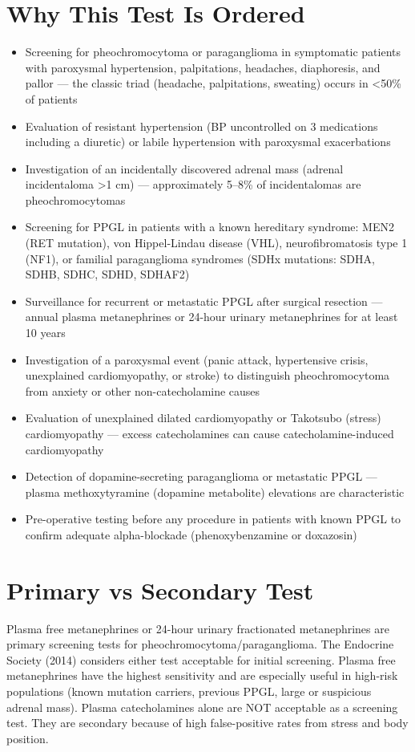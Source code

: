 \section*{Why This Test Is Ordered}
\begin{itemize}
  \item Screening for pheochromocytoma or paraganglioma in symptomatic patients with paroxysmal hypertension, palpitations, headaches, diaphoresis, and pallor --- the classic triad (headache, palpitations, sweating) occurs in <50\% of patients
  \item Evaluation of resistant hypertension (BP uncontrolled on 3 medications including a diuretic) or labile hypertension with paroxysmal exacerbations
  \item Investigation of an incidentally discovered adrenal mass (adrenal incidentaloma >1 cm) --- approximately 5--8\% of incidentalomas are pheochromocytomas
  \item Screening for PPGL in patients with a known hereditary syndrome: MEN2 (RET mutation), von Hippel-Lindau disease (VHL), neurofibromatosis type 1 (NF1), or familial paraganglioma syndromes (SDHx mutations: SDHA, SDHB, SDHC, SDHD, SDHAF2)
  \item Surveillance for recurrent or metastatic PPGL after surgical resection --- annual plasma metanephrines or 24-hour urinary metanephrines for at least 10 years
  \item Investigation of a paroxysmal event (panic attack, hypertensive crisis, unexplained cardiomyopathy, or stroke) to distinguish pheochromocytoma from anxiety or other non-catecholamine causes
  \item Evaluation of unexplained dilated cardiomyopathy or Takotsubo (stress) cardiomyopathy --- excess catecholamines can cause catecholamine-induced cardiomyopathy
  \item Detection of dopamine-secreting paraganglioma or metastatic PPGL --- plasma methoxytyramine (dopamine metabolite) elevations are characteristic
  \item Pre-operative testing before any procedure in patients with known PPGL to confirm adequate alpha-blockade (phenoxybenzamine or doxazosin)
\end{itemize}

\section*{Primary vs Secondary Test}
Plasma free metanephrines or 24-hour urinary fractionated metanephrines are primary screening tests for pheochromocytoma/paraganglioma. The Endocrine Society (2014) considers either test acceptable for initial screening. Plasma free metanephrines have the highest sensitivity and are especially useful in high-risk populations (known mutation carriers, previous PPGL, large or suspicious adrenal mass). Plasma catecholamines alone are NOT acceptable as a screening test. They are secondary because of high false-positive rates from stress and body position.

